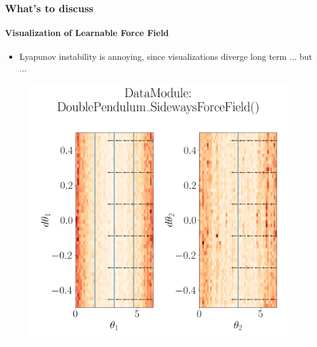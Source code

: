 \documentclass[usenames, dvipsnames, t]{beamer}
\begin{document}
\begin{frame}
	\frametitle{What's to discuss}
	\framesubtitle{Visualization of Learnable Force Field}
	\begin{itemize}
		\item Lyapunov instability is annoying, since visualizations diverge long term ... but ...
	\end{itemize}
	\centering
	\begin{figure}
	\includegraphics[height=0.7\textheight]{myplot1.png} 
	\end{figure}
\end{frame}
\end{document}
